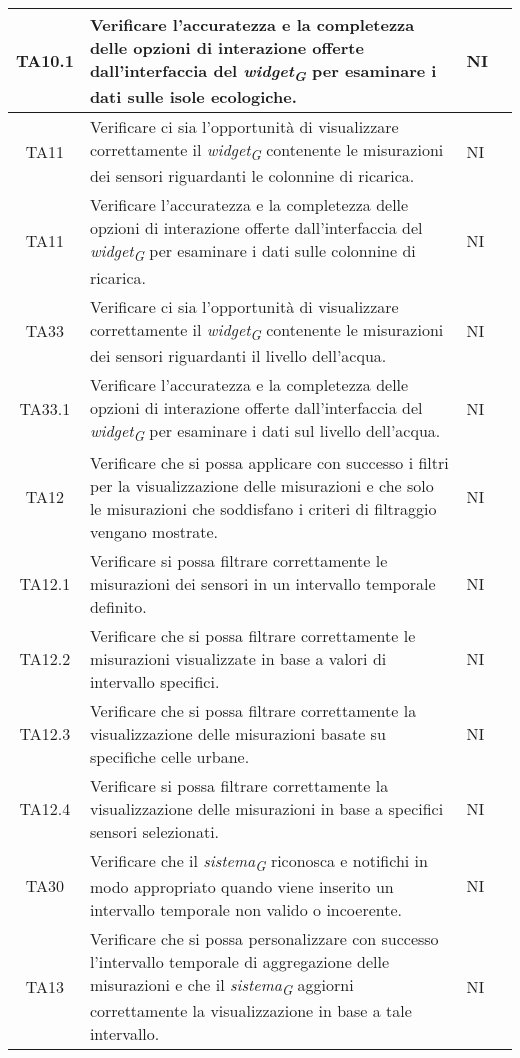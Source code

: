 \begin{longtable}{|c|p{5cm}|p{2cm}|c|}
    \hline
    TA10.1 & Verificare l'accuratezza e la completezza delle opzioni di interazione offerte dall'interfaccia del \textit{widget}\textsubscript{\textit{G}} per esaminare i dati sulle isole ecologiche. & NI \\
    \hline
    TA11 & Verificare ci sia l'opportunità di visualizzare correttamente il \textit{widget}\textsubscript{\textit{G}} contenente le misurazioni dei sensori riguardanti le colonnine di ricarica. & NI \\
    \hline
    TA11 & Verificare l'accuratezza e la completezza delle opzioni di interazione offerte dall'interfaccia del \textit{widget}\textsubscript{\textit{G}} per esaminare i dati sulle colonnine di ricarica. & NI \\
    \hline
    TA33 & Verificare ci sia l'opportunità di visualizzare correttamente il \textit{widget}\textsubscript{\textit{G}} contenente le misurazioni dei sensori riguardanti il livello dell'acqua. & NI \\
    \hline
    TA33.1 & Verificare l'accuratezza e la completezza delle opzioni di interazione offerte dall'interfaccia del \textit{widget}\textsubscript{\textit{G}} per esaminare i dati sul livello dell'acqua. & NI \\
    \hline
    TA12 & Verificare che si possa applicare con successo i filtri per la visualizzazione delle misurazioni e che solo le misurazioni che soddisfano i criteri di filtraggio vengano mostrate. & NI \\
    \hline
    TA12.1 & Verificare si possa filtrare correttamente le misurazioni dei sensori in un intervallo temporale definito. & NI \\
    \hline
    TA12.2 & Verificare che si possa filtrare correttamente le misurazioni visualizzate in base a valori di intervallo specifici. & NI \\
    \hline
    TA12.3 & Verificare che si possa filtrare correttamente la visualizzazione delle misurazioni basate su specifiche celle urbane. & NI \\
    \hline
    TA12.4 & Verificare si possa filtrare correttamente la visualizzazione delle misurazioni in base a specifici sensori selezionati. & NI \\
    \hline
    TA30 & Verificare che il \textit{sistema}\textsubscript{\textit{G}} riconosca e notifichi in modo appropriato quando viene inserito un intervallo temporale non valido o incoerente. & NI \\
    \hline
    TA13 & Verificare che si possa personalizzare con successo l'intervallo temporale di aggregazione delle misurazioni e che il \textit{sistema}\textsubscript{\textit{G}} aggiorni correttamente la visualizzazione in base a tale intervallo. & NI \\

\end{longtable}
